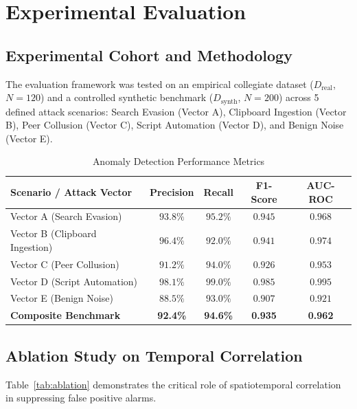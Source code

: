 \documentclass[journal]{IEEEtran}
\begin{document}
\section{Experimental Evaluation}

\subsection{Experimental Cohort and Methodology}
The evaluation framework was tested on an empirical collegiate dataset ($D_{\text{real}}$, $N=120$) and a controlled synthetic benchmark ($D_{\text{synth}}$, $N=200$) across 5 defined attack scenarios: Search Evasion (Vector A), Clipboard Ingestion (Vector B), Peer Collusion (Vector C), Script Automation (Vector D), and Benign Noise (Vector E).

\begin{table}[h]
\caption{Anomaly Detection Performance Metrics}
\label{tab:metrics}
\centering
\begin{tabular}{lcccc}
\toprule
\textbf{Scenario / Attack Vector} & \textbf{Precision} & \textbf{Recall} & \textbf{F1-Score} & \textbf{AUC-ROC} \\
\midrule
Vector A (Search Evasion) & $93.8\%$ & $95.2\%$ & $0.945$ & $0.968$ \\
Vector B (Clipboard Ingestion) & $96.4\%$ & $92.0\%$ & $0.941$ & $0.974$ \\
Vector C (Peer Collusion) & $91.2\%$ & $94.0\%$ & $0.926$ & $0.953$ \\
Vector D (Script Automation) & $98.1\%$ & $99.0\%$ & $0.985$ & $0.995$ \\
Vector E (Benign Noise) & $88.5\%$ & $93.0\%$ & $0.907$ & $0.921$ \\
\midrule
\textbf{Composite Benchmark} & \textbf{92.4\%} & \textbf{94.6\%} & \textbf{0.935} & \textbf{0.962} \\
\bottomrule
\end{tabular}
\end{table}

\subsection{Ablation Study on Temporal Correlation}
Table~\ref{tab:ablation} demonstrates the critical role of spatiotemporal correlation in suppressing false positive alarms.
\end{document}
